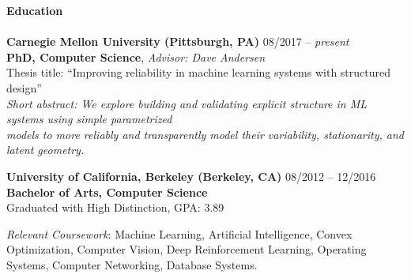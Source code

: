 \documentclass{article}
\begin{document}
\normalsize
\noindent
\textbf{{\Large Education}}\\[-2mm]
\HRule\\
\textbf{Carnegie Mellon University (Pittsburgh, PA)}
\hfill 08/2017 -- \textit{present} \\
\indent
\textbf{PhD, Computer Science}, \textit{Advisor: Dave Andersen}\\
\indent
Thesis title: ``Improving reliability in machine learning systems with structured design'' \\
\indent
\textit{Short abstract: We explore building and validating explicit structure in ML systems using simple parametrized }\\
\indent
\hspace{2.35cm}
\textit{models to more reliably and transparently model their variability, stationarity, and latent geometry.} \\
\vspace{-3.5mm}

\noindent
\textbf{University of California, Berkeley (Berkeley, CA)}
\hfill 08/2012 -- 12/2016 \\
\indent
\textbf{Bachelor of Arts, Computer Science} \\
\indent
Graduated with High Distinction, GPA: 3.89\\
\vspace{-3.5mm}

\noindent
\textit{Relevant Coursework}: Machine Learning, Artificial Intelligence, Convex Optimization, Computer Vision, Deep Reinforcement Learning, Operating Systems, Computer Networking, Database Systems.
\vspace{4mm}
\end{document}
